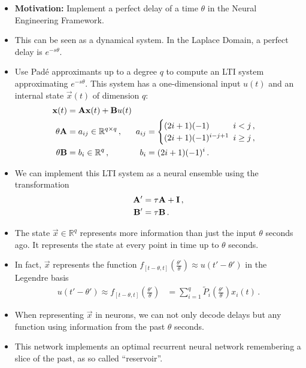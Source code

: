 \documentclass[10pt,letterpaper,oneside]{article}
\begin{document}
\begin{itemize}
	\item \textbf{Motivation:} Implement a perfect delay of a time $\theta$ in the Neural Engineering Framework.
	\item This can be seen as a dynamical system. In the Laplace Domain, a perfect delay is $e^{-s\theta}$.
	\item Use Padé approximants up to a degree $q$ to compute an LTI system approximating $e^{-s\theta}$. This system has a one-dimensional input $u(t)$ and an internal state $\vec x(t)$ of dimension $q$:
	\begin{align}
		{\mathbf{x}}(t) &= {\mathbf{A}} {\mathbf{x}}(t) + {\mathbf{B}} u(t) \\
	    \theta {\mathbf{A}} &= a_{ij} \in \mathbb{R}^{q \times q} \,, & \kern-0.5em a_{ij} &= \begin{cases}
		(2i + 1)(-1) & \kern-0.5em i < j \,,\\
		(2i + 1)(-1)^{i - j + 1} & \kern-0.5em i \geq j \,,
		\end{cases}\\
		\theta {\mathbf{B}} &= b_i \in \mathbb{R}^{q} \,, & \kern-0.5em b_i &= (2i + 1)(-1)^i \,.
		\label{eqn:delay_network_lti}
	\end{align}
	\item We can implement this LTI system as a neural ensemble using the transformation
	\begin{align*}
		{\mathbf{A}}' &= \tau {\mathbf{A}} + {\mathbf{I}} \,,\\
		{\mathbf{B}}' &= \tau {\mathbf{B}} \,.
	\end{align*}
	\item The state $\vec x \in \mathbb{R}^q$ represents more information than just the input $\theta$ seconds ago. It represents the state at every point in time up to $\theta$ seconds.
	\item In fact, $\vec x$ represents the function $f_{[t - \theta, t]}\left(\frac{\theta'}{\theta}\right) \approx u\left(t' - \theta' \right)$ in the Legendre basis
	\begin{align*}
		u\left(t' - \theta' \right) \approx f_{[t - \theta, t]}\left(\frac{\theta'}{\theta}\right) &= \sum_{i=1}^q \tilde P_i \left( \frac{\theta'}{\theta} \right) x_i(t) \,.
	\end{align*}
	\item When representing $\vec x$ in neurons, we can not only decode delays but any function using information from the past $\theta$ seconds.
	\item This network implements an optimal recurrent neural network remembering a slice of the past, as so called \enquote{reservoir}.
\end{itemize}
\end{document}
